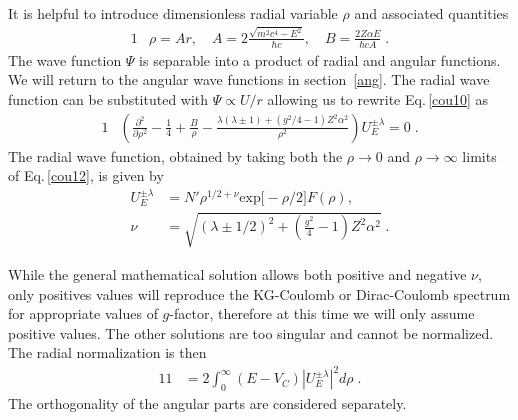 \documentclass[epj]{svjour}
\begin{document}
It is helpful to introduce dimensionless radial variable $\rho$ and associated quantities
\begin{alignat}{1}
\label{cou11} &\rho=Ar,\quad 
A=2\frac{\displaystyle\sqrt{\displaystyle m^{2}c^{4}-E^{2}}}{\hbar c},\quad 
B=\frac{2Z\alpha E}{\hbar cA}\;.
\end{alignat}
The wave function $\Psi$ is separable into a product of radial and angular functions. We will return to the angular wave functions in section~\ref{ang}. The radial wave function can be substituted with $\Psi\propto U/r$ allowing us to rewrite Eq.\,\eqref{cou10} as
\begin{alignat}{1}
\label{cou12} &\left(\!\frac{\partial^{2}}{\partial\rho^{2}}\!-\!\frac{1}{4}\!+\!\frac{B}{\rho}\!-\!\frac{\lambda(\lambda\pm1)\!+\!\left(\displaystyle g^{2}/4-1\right)\!Z^{2}\alpha^{2}}{\rho^{2}}\right)\! U_{E}^{\pm\lambda}=0\;.
\end{alignat}
The radial wave function, obtained by taking both the $\rho\rightarrow0$ and $\rho\rightarrow\infty$ limits of Eq.\,\eqref{cou12}, is given by
\begin{subequations}
\begin{alignat}{1}
\label{cou14} U_{E}^{\pm\lambda}&=N'\rho^{1/2+\nu}\mathrm{exp}\Big[-\rho/2\Big]F(\rho),\\[0.2cm]
\label{cou14b} \nu&=\sqrt{\left(\lambda\pm1/2\right)^{2}+\left(\frac{g^{2}}{4}-1\right)Z^{2}\alpha^{2}}\;.
\end{alignat}
\end{subequations}

While the general mathematical solution allows both positive and negative $\nu$, only positives values will reproduce the KG-Coulomb or Dirac-Coulomb spectrum for appropriate values of $g$-factor, therefore at this time we will only assume positive values. The other solutions are too singular and cannot be normalized. The radial normalization is then
\begin{alignat}{1}
\label{cou18} 1&=2\int_{0}^{\infty}(E-V_{C})|U_{E}^{\pm\lambda}|^{2}d\rho\;.
\end{alignat}
The orthogonality of the angular parts are considered separately.
\end{document}
